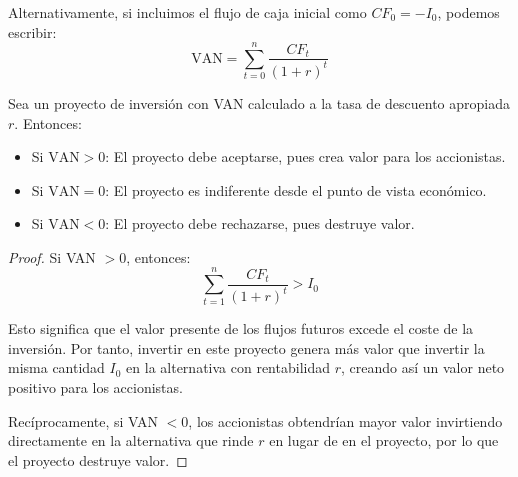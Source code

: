 Alternativamente, si incluimos el flujo de caja inicial como $CF_0 = -I_0$, podemos escribir:
\begin{equation}
\text{VAN} = \sum_{t=0}^{n} \frac{CF_t}{(1+r)^t}
\end{equation}

\begin{center}
    
\end{center}

\begin{teorema}
Sea un proyecto de inversión con VAN calculado a la tasa de descuento apropiada $r$. Entonces:
\begin{itemize}
\item Si $\text{VAN} > 0$: El proyecto debe aceptarse, pues crea valor para los accionistas.
\item Si $\text{VAN} = 0$: El proyecto es indiferente desde el punto de vista económico.
\item Si $\text{VAN} < 0$: El proyecto debe rechazarse, pues destruye valor.
\end{itemize}
\end{teorema}

\begin{proof}
Si VAN $> 0$, entonces:
$$\sum_{t=1}^{n} \frac{CF_t}{(1+r)^t} > I_0$$

Esto significa que el valor presente de los flujos futuros excede el coste de la inversión. Por tanto, invertir en este proyecto genera más valor que invertir la misma cantidad $I_0$ en la alternativa con rentabilidad $r$, creando así un valor neto positivo para los accionistas.

Recíprocamente, si VAN $< 0$, los accionistas obtendrían mayor valor invirtiendo directamente en la alternativa que rinde $r$ en lugar de en el proyecto, por lo que el proyecto destruye valor.
\end{proof}

\begin{center}
    
\end{center}

